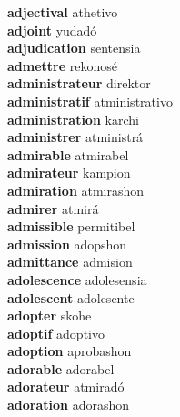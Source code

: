 \textbf{adjectival } athetivo \\
\textbf{adjoint } yudadó \\
\textbf{adjudication } sentensia \\
\textbf{admettre } rekonosé \\
\textbf{administrateur } direktor \\
\textbf{administratif } atministrativo \\
\textbf{administration } karchi \\
\textbf{administrer } atministrá \\
\textbf{admirable } atmirabel \\
\textbf{admirateur } kampion \\
\textbf{admiration } atmirashon \\
\textbf{admirer } atmirá \\
\textbf{admissible } permitibel \\
\textbf{admission } adopshon \\
\textbf{admittance } admision \\
\textbf{adolescence } adolesensia \\
\textbf{adolescent } adolesente \\
\textbf{adopter } skohe \\
\textbf{adoptif } adoptivo \\
\textbf{adoption } aprobashon \\
\textbf{adorable } adorabel \\
\textbf{adorateur } atmiradó \\
\textbf{adoration } adorashon \\
